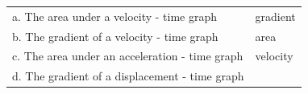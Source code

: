 \begin{enumerate}[noitemsep, label=\textbf{\arabic*}. ]
{{\begin{center}
\begin{tabular}[t]{|l|l|}
    
        a. The area under a velocity - time graph &
    
    
        gradient%
     \tabularnewline\cline{1-1}\cline{2-2}
    
    
        b. The gradient of a velocity - time graph &
    
    
        area%
     \tabularnewline\cline{1-1}\cline{2-2}
    
    
        c. The area under an acceleration - time graph &
    
    
        velocity%
     \tabularnewline\cline{1-1}\cline{2-2}
    
    
        d. The gradient of a displacement - time graph &
    
    

\end{tabular}
\end{center}}}
\end{enumerate}
